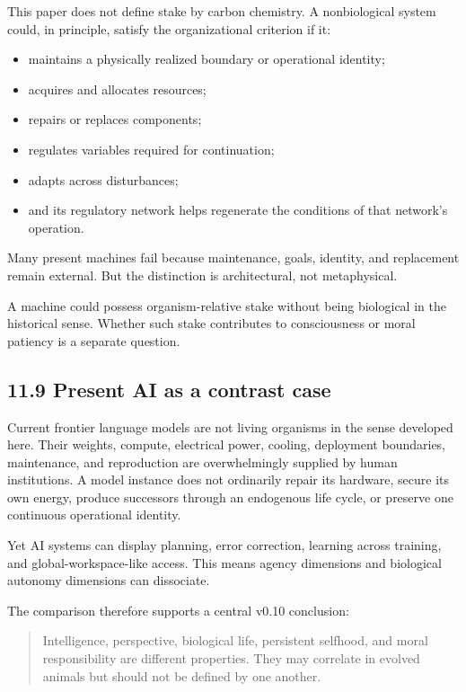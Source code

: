 \documentclass[
  11pt,
]{article}
\providecommand{\tightlist}{%
  \setlength{\itemsep}{0pt}\setlength{\parskip}{0pt}}
\begin{document}
This paper does not define stake by carbon chemistry. A nonbiological
system could, in principle, satisfy the organizational criterion if it:

\begin{itemize}
\tightlist
\item
  maintains a physically realized boundary or operational identity;
\item
  acquires and allocates resources;
\item
  repairs or replaces components;
\item
  regulates variables required for continuation;
\item
  adapts across disturbances;
\item
  and its regulatory network helps regenerate the conditions of that
  network's operation.
\end{itemize}

Many present machines fail because maintenance, goals, identity, and
replacement remain external. But the distinction is architectural, not
metaphysical.

A machine could possess organism-relative stake without being biological
in the historical sense. Whether such stake contributes to consciousness
or moral patiency is a separate question.

\subsection{11.9 Present AI as a contrast
case}\label{present-ai-as-a-contrast-case}

Current frontier language models are not living organisms in the sense
developed here. Their weights, compute, electrical power, cooling,
deployment boundaries, maintenance, and reproduction are overwhelmingly
supplied by human institutions. A model instance does not ordinarily
repair its hardware, secure its own energy, produce successors through
an endogenous life cycle, or preserve one continuous operational
identity.

Yet AI systems can display planning, error correction, learning across
training, and global-workspace-like access. This means agency dimensions
and biological autonomy dimensions can dissociate.

The comparison therefore supports a central v0.10 conclusion:

\begin{quote}
Intelligence, perspective, biological life, persistent selfhood, and
moral responsibility are different properties. They may correlate in
evolved animals but should not be defined by one another.
\end{quote}
\end{document}
